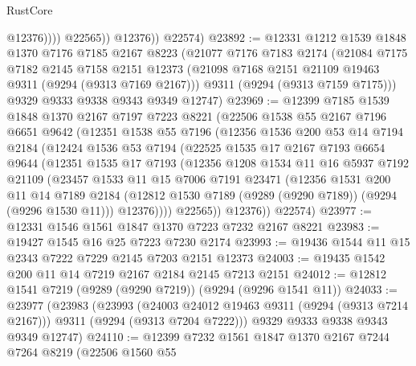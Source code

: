 \begin{lexlean}{RustCore}
\begin{coremodule}
                      @12376))))
              @22565))
          @12376))
      @22574)
@23892 := @12331
    @1212
    @1539
    @1848
    @1370
    @7176
    @7185
    @2167
    @8223
    (@21077
      @7176
      @7183
      @2174
      (@21084
        @7175
        @7182
        @2145
        @7158
        @2151
        @12373
        (@21098 @7168 @2151 @21109 @19463 @9311 (@9294 (@9313 @7169 @2167)))
        @9311
        (@9294 (@9313 @7159 @7175)))
      @9329
      @9333
      @9338
      @9343
      @9349
      @12747)
@23969 := @12399
    @7185
    @1539
    @1848
    @1370
    @2167
    @7197
    @7223
    @8221
    (@22506
      @1538
      @55
      @2167
      @7196
      @6651
      @9642
      (@12351
        @1538
        @55
        @7196
        (@12356
          @1536
          @200
          @53
          @14
          @7194
          @2184
          (@12424
            @1536
            @53
            @7194
            (@22525
              @1535
              @17
              @2167
              @7193
              @6654
              @9644
              (@12351
                @1535
                @17
                @7193
                (@12356
                  @1208
                  @1534
                  @11
                  @16
                  @5937
                  @7192
                  @21109
                  (@23457
                    @1533
                    @11
                    @15
                    @7006
                    @7191
                    @23471
                    (@12356
                      @1531
                      @200
                      @11
                      @14
                      @7189
                      @2184
                      (@12812 @1530 @7189 (@9289 (@9290 @7189)) (@9294 (@9296 @1530 @11)))
                      @12376))))
              @22565))
          @12376))
      @22574)
@23977 := @12331 @1546 @1561 @1847 @1370 @7223 @7232 @2167 @8221
@23983 := @19427 @1545 @16 @25 @7223 @7230 @2174
@23993 := @19436 @1544 @11 @15 @2343 @7222 @7229 @2145 @7203 @2151 @12373
@24003 := @19435 @1542 @200 @11 @14 @7219 @2167 @2184 @2145 @7213 @2151
@24012 := @12812 @1541 @7219 (@9289 (@9290 @7219)) (@9294 (@9296 @1541 @11))
@24033 := @23977
    (@23983
      (@23993
        (@24003 @24012 @19463 @9311 (@9294 (@9313 @7214 @2167)))
        @9311
        (@9294 (@9313 @7204 @7222)))
      @9329
      @9333
      @9338
      @9343
      @9349
      @12747)
@24110 := @12399
    @7232
    @1561
    @1847
    @1370
    @2167
    @7244
    @7264
    @8219
    (@22506
      @1560
      @55

\end{coremodule}
\end{lexlean}
